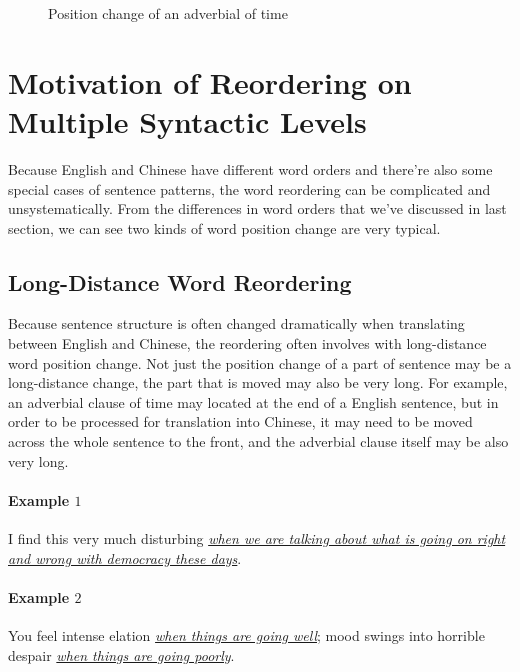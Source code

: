 \begin{figure}[H]
\centering

\caption{Position change of an adverbial of time}
\end{figure}

\section{Motivation of Reordering on Multiple Syntactic Levels}
\label{ch:ReorderingApproach:sec:Motivation}

Because English and Chinese have different word orders and there're also some special cases of sentence patterns, the word reordering can be complicated and unsystematically. From the differences in word orders that we've discussed in last section, we can see two kinds of word position change are very typical.

\subsection{Long-Distance Word Reordering}

Because sentence structure is often changed dramatically when translating between English and Chinese, the reordering often involves with long-distance word position change. Not just the position change of a part of sentence may be a long-distance change, the part that is moved may also be very long. For example, an adverbial clause of time may located at the end of a English sentence, but in order to be processed for translation into Chinese, it may need to be moved across the whole sentence to the front, and the adverbial clause itself may be also very long. 

\paragraph{Example $1$}
I find this very much disturbing \textit{\ul{when we are talking about what is going on right and wrong with democracy these days}}.\smallskip\\

\paragraph{Example $2$}
You feel intense elation \textit{\ul{when things are going well}}; mood swings into horrible despair \textit{\ul{when things are going poorly}}.\smallskip\\

